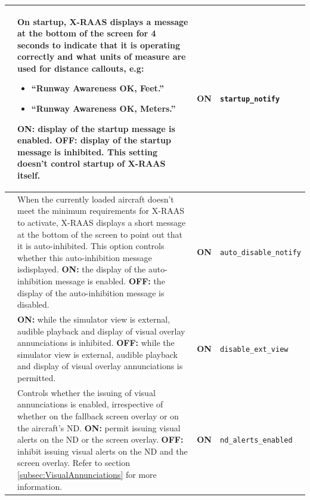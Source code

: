 \documentclass[a4paper,12pt]{article}
\newcommand{\confopt}[1]{\texttt{#1}}
\begin{document}
{\begin{center}
\begin{supertabular}{|c|p{8cm}|c|l|}
\hline

 &
On startup, X-RAAS displays a message at the bottom of the screen for 4
seconds to indicate that it is operating correctly and what units of
measure are used for distance callouts, e.g:
\begin{itemize}
\item ``Runway Awareness OK, Feet.''
\item ``Runway Awareness OK, Meters.''
\end{itemize}
\textbf{ON:} display of the startup message is enabled.\newline
\textbf{OFF:} display of the startup message is inhibited.\newline
This setting doesn't control startup of X-RAAS itself. & \textbf{ON} &
\confopt{startup\_notify} \\

\hline

 &
When the currently loaded aircraft doesn't meet the minimum requirements
for X-RAAS to activate, X-RAAS displays a short message at the bottom of
the screen to point out that it is auto-inhibited. This option controls
whether this auto-inhibition message isdisplayed.\newline
\textbf{ON:} the display of the auto-inhibition message is enabled.\newline
\textbf{OFF:} the display of the auto-inhibition message is disabled. &
\textbf{ON} & \confopt{auto\_disable\_notify} \\

\hline

 &
\textbf{ON:} while the simulator view is external, audible playback and
display of visual overlay annunciations is inhibited.\newline
\textbf{OFF:} while the simulator view is external, audible playback and
display of visual overlay annunciations is permitted. & \textbf{ON} &
\confopt{disable\_ext\_view} \\

\hline

 &
Controls whether the issuing of visual annunciations is enabled,
irrespective of whether on the fallback screen overlay or on the
aircraft's ND.\newline
\textbf{ON:} permit issuing visual alerts on the ND or the screen
overlay.\newline
\textbf{OFF:} inhibit issuing visual alerts on the ND and the screen
overlay.\newline
Refer to section \ref{subsec:VisualAnnunciations} for more information. &
\textbf{ON} & \confopt{nd\_alerts\_enabled} \\


\end{supertabular}
\end{center}}
\end{document}
